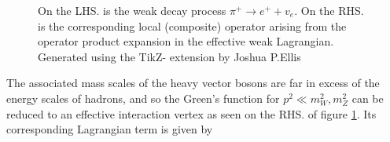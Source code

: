 \documentclass[a4paper,10pt]{article}
\begin{document}
\begin{figure}[H]
\centering
{}
\quad
{}
\caption{On the LHS. is the weak decay process $\pi^{+} \rightarrow e^{+}+v_{e}$. On the RHS. is the corresponding local (composite) operator arising from the operator product expansion in the effective weak Lagrangian. Generated using the TikZ- extension by Joshua P.Ellis \cite{ELLIS2017103}}
\label{fig:feynman_weak_decay}
\end{figure}
The associated mass scales of the heavy vector bosons are far in excess of the energy scales of hadrons, and so the Green's function for $p^2 \ll m_W^2, m_Z^2$ can be reduced to an effective interaction vertex as seen on the RHS. of figure \ref{fig:feynman_weak_decay}. Its corresponding Lagrangian term is given by
\end{document}
